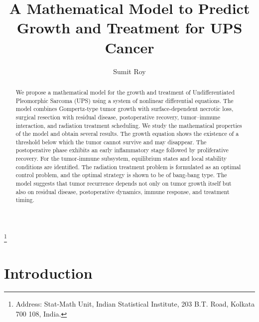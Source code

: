 \documentclass[11pt, reqno]{amsart}
\numberwithin{equation}{section}
\theoremstyle{definition}
\begin{document}
	\title[Mathematical Model to Predict Growth and Treatment for UPS Cancer]{A Mathematical Model to Predict Growth and Treatment for UPS Cancer}

	
	\author[S. Roy]{Sumit Roy}
\address{Stat-Math Unit, Indian Statistical Institute, 203 B.T. Road, Kolkata 700 108, India.}
\thanks{Address: Stat-Math Unit, Indian Statistical Institute, 203 B.T. Road, Kolkata 700 108, India.}

\begin{abstract}
We propose a mathematical model for the growth and treatment of Undifferentiated Pleomorphic Sarcoma (UPS) using a system of nonlinear differential equations. The model combines Gompertz-type tumor growth with surface-dependent necrotic loss, surgical resection with residual disease, postoperative recovery, tumor--immune interaction, and radiation treatment scheduling. We study the mathematical properties of the model and obtain several results. The growth equation shows the existence of a threshold below which the tumor cannot survive and may disappear. The postoperative phase exhibits an early inflammatory stage followed by proliferative recovery. For the tumor-immune subsystem, equilibrium states and local stability conditions are identified. The radiation treatment problem is formulated as an optimal control problem, and the optimal strategy is shown to be of bang-bang type. The model suggests that tumor recurrence depends not only on tumor growth itself but also on residual disease, postoperative dynamics, immune response, and treatment timing.
\end{abstract}

\maketitle


\section{Introduction}
\end{document}
